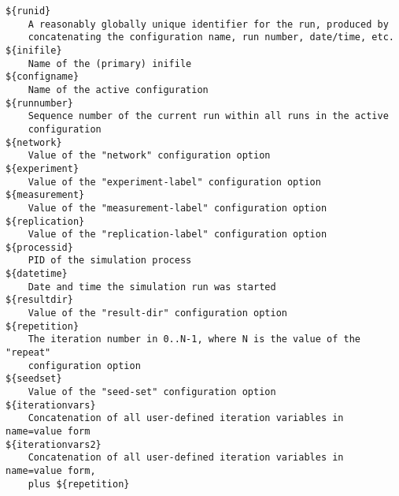 \begin{verbatim}
${runid}
    A reasonably globally unique identifier for the run, produced by
    concatenating the configuration name, run number, date/time, etc.
${inifile}
    Name of the (primary) inifile
${configname}
    Name of the active configuration
${runnumber}
    Sequence number of the current run within all runs in the active
    configuration
${network}
    Value of the "network" configuration option
${experiment}
    Value of the "experiment-label" configuration option
${measurement}
    Value of the "measurement-label" configuration option
${replication}
    Value of the "replication-label" configuration option
${processid}
    PID of the simulation process
${datetime}
    Date and time the simulation run was started
${resultdir}
    Value of the "result-dir" configuration option
${repetition}
    The iteration number in 0..N-1, where N is the value of the "repeat"
    configuration option
${seedset}
    Value of the "seed-set" configuration option
${iterationvars}
    Concatenation of all user-defined iteration variables in name=value form
${iterationvars2}
    Concatenation of all user-defined iteration variables in name=value form,
    plus ${repetition}
\end{verbatim}

